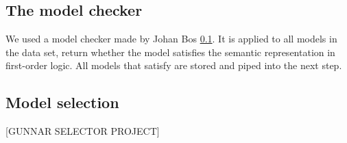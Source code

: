 \subsection{The model checker}
We used a model checker made by Johan Bos \ref{}. It is applied to all models in the data set, return whether the model satisfies the semantic representation in first-order logic. All models that satisfy are stored and piped into the next step.

\subsection{Model selection}\label{sec:model_selection}
[GUNNAR SELECTOR PROJECT]